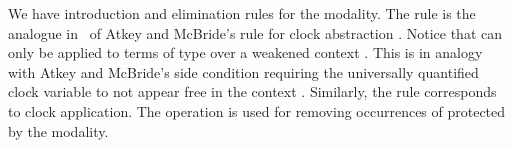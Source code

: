 \begin{AgdaAlign}
\begin{code}
\AgdaSpace{}%
\AgdaSpace{}%
\AgdaSpace{}%
\AgdaSymbol{(}\AgdaSpace{}%
\AgdaSpace{}%
\AgdaSpace{}%
\AgdaSymbol{)}\AgdaSpace{}%
\AgdaSpace{}%
\AgdaSpace{}%
\AgdaSpace{}%
\AgdaSymbol{(}\AgdaSpace{}%
\AgdaSymbol{)}\<%
\end{code}
We have introduction and elimination
rules for the  modality. The rule  is the analogue in \GTT\ of 
Atkey and McBride's rule for clock abstraction
\cite{atkey2013productive}. Notice that  can only be applied
to terms of type  over a weakened context 
. This is in analogy with Atkey and McBride's side condition
requiring the universally quantified clock variable to not appear free
in the context . Similarly, the rule  corresponds to
clock application. The operation  is used for removing occurrences of  protected by the  modality.
\begin{code}%
%
\>[4]\AgdaSpace{}%
\AgdaSymbol{:}\AgdaSpace{}%
\AgdaSymbol{\{}\AgdaSpace{}%
\AgdaSymbol{:}\AgdaSpace{}%
\AgdaSpace{}%
\AgdaSymbol{\}}\AgdaSpace{}%
\AgdaSymbol{\{}\AgdaSpace{}%
\AgdaSymbol{:}\AgdaSpace{}%
\AgdaSpace{}%
\AgdaSymbol{\}}\AgdaSpace{}%
\AgdaSpace{}%
\AgdaSpace{}%
\AgdaSymbol{(}\AgdaSpace{}%
\AgdaSymbol{)}\AgdaSpace{}%
\AgdaSpace{}%
\AgdaSpace{}%
\AgdaSpace{}%
\AgdaSpace{}%
\AgdaSymbol{(}\AgdaSpace{}%
\AgdaSymbol{)}\<%
\\
%
\>[4]\AgdaSpace{}%
\AgdaSymbol{:}\AgdaSpace{}%
\AgdaSymbol{\{}\AgdaSpace{}%
\AgdaSymbol{:}\AgdaSpace{}%
\AgdaSpace{}%
\AgdaSymbol{\}}\AgdaSpace{}%
\AgdaSymbol{\{}\AgdaSpace{}%
\AgdaSymbol{:}\AgdaSpace{}%
\AgdaSpace{}%
\AgdaSymbol{\}}\AgdaSpace{}%
\AgdaSpace{}%
\AgdaSpace{}%
\AgdaSpace{}%
\AgdaSymbol{(}\AgdaSpace{}%
\AgdaSymbol{)}\AgdaSpace{}%
\AgdaSpace{}%

\end{code}
\end{AgdaAlign}
